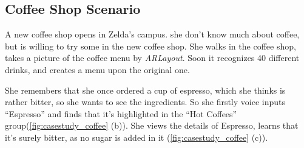 

\subsection{Coffee Shop Scenario}

A new coffee shop opens in Zelda's campus.
she don't know much about coffee,
but is willing to try some in the new coffee shop.
She walks in the coffee shop, takes a picture of the coffee menu by \textit{ARLayout}.
Soon it recognizes 40 different drinks, and creates a menu upon the original one.

She remembers that she once ordered a cup of espresso,
which she thinks is rather bitter, so she wants to see the ingredients.
So she firstly voice inputs ``Espresso'' and finds that
it's highlighted in the ``Hot Coffees'' group(\autoref{fig:casestudy_coffee} (b)).
She views the details of Espresso, learns that it's surely bitter,
as no sugar is added in it (\autoref{fig:casestudy_coffee} (c)).

